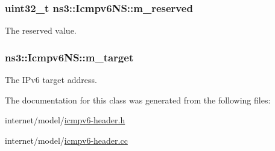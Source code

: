 \subsubsection[{\texorpdfstring{m\+\_\+reserved}{m_reserved}}]{\setlength{\rightskip}{0pt plus 5cm}uint32\+\_\+t ns3\+::\+Icmpv6\+N\+S\+::m\+\_\+reserved\hspace{0.3cm}{\ttfamily [private]}}\hypertarget{classns3_1_1Icmpv6NS_a0656ce5bbe33a72e877c7f8193cfc78c}{}\label{classns3_1_1Icmpv6NS_a0656ce5bbe33a72e877c7f8193cfc78c}


The reserved value. 

\subsubsection[{\texorpdfstring{m\+\_\+target}{m_target}}]{ ns3\+::\+Icmpv6\+N\+S\+::m\+\_\+target\hspace{0.3cm}{\ttfamily [private]}}\hypertarget{classns3_1_1Icmpv6NS_a50c41d5ef2775b47464f18c76b1b1359}{}\label{classns3_1_1Icmpv6NS_a50c41d5ef2775b47464f18c76b1b1359}


The I\+Pv6 target address. 



The documentation for this class was generated from the following files\+:\begin{DoxyCompactItemize}
\item 
internet/model/\hyperlink{icmpv6-header_8h}{icmpv6-\/header.\+h}\item 
internet/model/\hyperlink{icmpv6-header_8cc}{icmpv6-\/header.\+cc}\end{DoxyCompactItemize}
